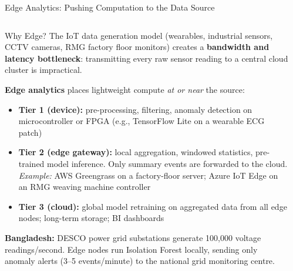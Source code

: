 \documentclass[aspectratio=169,10pt]{beamer}
\begin{document}
\begin{frame}{Edge Analytics: Pushing Computation to the Data Source}
  \begin{columns}[T]
      \begin{block}{Why Edge?}
        The IoT data generation model (wearables, industrial sensors, CCTV cameras, RMG factory floor monitors) creates a \textbf{bandwidth and latency bottleneck}: transmitting every raw sensor reading to a central cloud cluster is impractical.

        \vspace{4pt}
        \textbf{Edge analytics} places lightweight compute \textit{at or near} the source:
        \begin{itemize}
          \item \textbf{Tier 1 (device):} pre-processing, filtering, anomaly detection on microcontroller or FPGA (e.g., TensorFlow Lite on a wearable ECG patch)
          \item \textbf{Tier 2 (edge gateway):} local aggregation, windowed statistics, pre-trained model inference.  Only summary events are forwarded to the cloud.  \textit{Example:} AWS Greengrass on a factory-floor server; Azure IoT Edge on an RMG weaving machine controller
          \item \textbf{Tier 3 (cloud):} global model retraining on aggregated data from all edge nodes; long-term storage; BI dashboards
        \end{itemize}

        \vspace{4pt}
        \textbf{Bangladesh:} DESCO power grid substations generate 100{,}000 voltage readings/second.  Edge nodes run Isolation Forest locally, sending only anomaly alerts (3--5 events/minute) to the national grid monitoring centre.
      \end{block}

      \begin{center}
\end{center}
\end{columns}
\end{frame}
\end{document}
